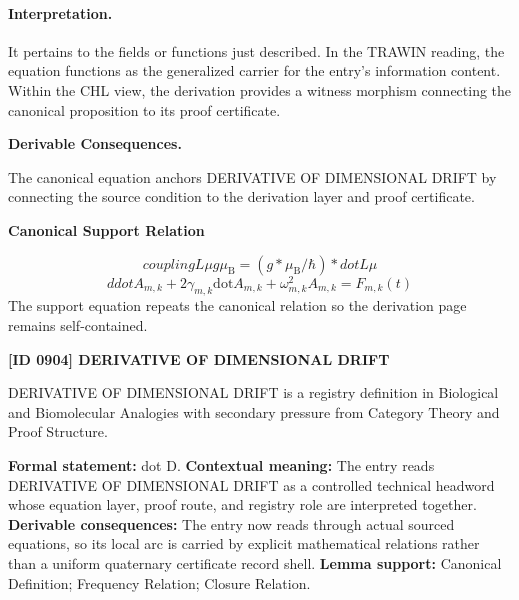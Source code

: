 \paragraph{Interpretation.}
It pertains to the fields or functions just described. In the TRAWIN reading, the equation functions as the generalized carrier for the entry’s information content. Within the CHL view, the derivation provides a witness morphism connecting the canonical proposition to its proof certificate.

\par\vspace{0.35em}
\noindent\textbf{Derivable Consequences.}\quad
\begingroup
\footnotesize
\raggedright
The canonical equation anchors DERIVATIVE OF DIMENSIONAL DRIFT by connecting the source condition to the derivation layer and proof certificate.
\par\endgroup

\noindent\textbf{Canonical Support Relation}\par
\[
coupling L \mu g \mu_{\mathrm{B}} = (g * \mu_{\mathrm{B}}/\hbar) * dot L \mu
\]
\[
ddot A_{m,k} + 2\gamma_{m,k}\mathrm{dot} A_{m,k} + \omega_{m,k}^2 A_{m,k} = F_{m,k}(t)
\]
\noindent The support equation repeats the canonical relation so the derivation page remains self-contained.\par

\clearpage
\noindent\textbf{[ID 0904] DERIVATIVE OF DIMENSIONAL DRIFT}\par
\vspace{0.35em}
\begingroup\small
{}
DERIVATIVE OF DIMENSIONAL DRIFT is a registry definition in Biological and Biomolecular Analogies with secondary pressure from Category Theory and Proof Structure.

\begingroup\footnotesize\setlength{\emergencystretch}{3em}\sloppy
\textbf{Formal statement:} dot D. \textbf{Contextual meaning:} The entry reads DERIVATIVE OF DIMENSIONAL DRIFT as a controlled technical headword whose equation layer, proof route, and registry role are interpreted together. \textbf{Derivable consequences:} The entry now reads through actual sourced equations, so its local arc is carried by explicit mathematical relations rather than a uniform quaternary certificate record shell. \textbf{Lemma support:} Canonical Definition; Frequency Relation; Closure Relation.\par
\endgroup

